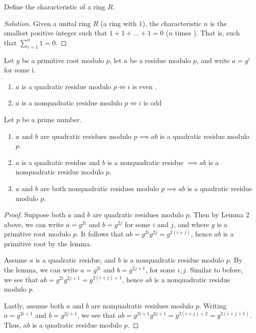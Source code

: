 \documentclass[11pt]{article}
\begin{document}
\begin{exercise}{12}
Define the characteristic of a ring $ R $.
\end{exercise}

\begin{proof}[Solution]
Given a unital ring $ R $ (a ring with $ 1 $), the characteristic $ n $ is the smallest positive integer such that $ 1 + 1 + \dots + 1 = 0 $ ($ n $ times ). That is, such that
$ \sum_{i = 1}^{n} 1 = 0$.
\end{proof}

\begin{lemma}{2}
Let $ g $ be a primitive root modulo $ p $, let $ a  $ be a residue modulo $ p $, and write $ a = g^{i} $ for some i.
\begin{enumerate}
\item $ a $ is a quadratic residue modulo $ p \iff i $ is even .
\item $ a $ is a nonquadratic residue modulo $ p \iff i $ is odd
\end{enumerate}
\end{lemma}

\begin{exercise}{13}
Let $ p $ be a prime number.
\begin{enumerate}
\item $ a $ and $ b $ are quadratic residues modulo $ p \implies ab $ is a quadratic residue modulo $ p $.
\item $ a $ is a quadratic residue and $ b $ is a nonquadratic residue $ \implies ab $ is a nonquadratic residue modulo $ p $.
\item $ a $ and $ b $ are both nonquadratic residues modulo $ p \implies ab $ is a quadratic residue modulo $ p $.
\end{enumerate}
\end{exercise}

\begin{proof}
 Suppose both $ a $ and $ b $ are quadratic residues modulo $ p $. Then by Lemma 2 above, we can write $ a = g^{2i} $ and $ b = g^{2j} $ for some $ i $ and $ j $, and where $ g $ is a primitive root modulo $ p $. It follows that $ ab = g^{2i} g^{2j} = g^{2(i + j)} $, hence $ ab $ is a primitive root by the lemma.

 Assume $ a $ is a quadratic residue, and $ b $ is a nonquadratic residue modulo $ p $. By the lemma, we can write $ a = g^{2i} $ and $ b = g^{2j+1} $, for some $ i, j $. Similar to before, we see that $ ab = g^{2i} g^{2j+1} = g^{2(i + j) + 1} $, hence $ ab $ is a nonquadratic residue modulo $ p $.

 Lastly, assume both $ a $ and $ b $ are nonquadratic residues modulo $ p $. Writing $ a = g^{2i+1} $ and $ b = g^{2j+1} $, we see that $ ab = g^{2i+1} g^{2j+1} = g^{2(i + j) + 2} = g^{2(i + j + 1)} $. Thus, $ ab $ is a quadratic residue modulo $ p $.
\end{proof}
\end{document}
